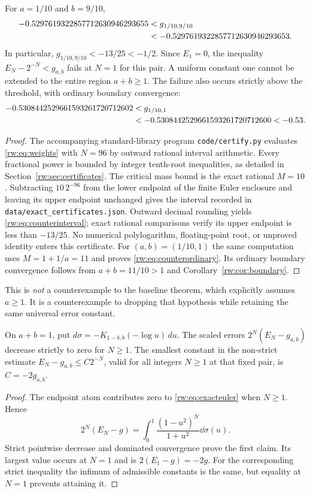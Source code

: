 \begin{theorem}\label{rw:thm:counterexample}
For $a=1/10$ and $b=9/10$,
\begin{align}\label{rw:eq:counterinterval}
 -0.5297619322857712630946293655
 &<g_{1/10,9/10}\notag\\
 &<-0.5297619322857712630946293653.
\end{align}
In particular, $g_{1/10,9/10}<-13/25<-1/2$.
Since $E_1=0$, the inequality $E_N-2^{-N}<g_{a,b}$ fails at $N=1$
for this pair. A uniform constant one cannot be extended to the
entire region $a+b\ge1$. The failure also occurs strictly above
the threshold, with ordinary boundary convergence:
\begin{align}\label{rw:eq:counterordinary}
 -0.5308442529661593261720712602
 &<g_{1/10,1}\notag\\
 &<-0.5308442529661593261720712600<-0.53.
\end{align}
\end{theorem}
\begin{proof}
The accompanying standard-library program \texttt{code/certify.py}
evaluates \eqref{rw:eq:weights} with $N=96$ by outward rational interval
arithmetic. Every fractional power is bounded by integer tenth-root
inequalities, as detailed in Section~\ref{rw:sec:certificates}. The
critical mass bound is the exact rational $M=10$. Subtracting
$10\,2^{-96}$ from the lower endpoint of the finite Euler enclosure
and leaving its upper endpoint unchanged gives the interval recorded
in \texttt{data/exact\_certificates.json}. Outward decimal rounding
yields \eqref{rw:eq:counterinterval}; exact rational comparisons verify
its upper endpoint is less than $-13/25$. No numerical polylogarithm,
floating-point root, or unproved identity enters this certificate.
For $(a,b)=(1/10,1)$ the same computation uses $M=1+1/a=11$
and proves \eqref{rw:eq:counterordinary}. Its ordinary boundary
convergence follows from $a+b=11/10>1$ and
Corollary~\ref{rw:cor:boundary}.
\end{proof}

This is \emph{not} a counterexample to the baseline theorem, which
explicitly assumes $a\ge1$. It is a counterexample to dropping that
hypothesis while retaining the same universal error constant.

\begin{proposition}
\label{rw:prop:fixedconstant}
On $a+b=1$, put $d\sigma=-K_{1-b,b}(-\log u)\,du$. The scaled errors $2^N(E_N-g_{a,b})$ decrease strictly
to zero for $N\ge1$. The smallest constant in the non-strict estimate
$E_N-g_{a,b}\le C2^{-N}$, valid for all integers $N\ge1$ at that fixed
pair, is $C=-2g_{a,b}$.
\end{proposition}
\begin{proof}
The endpoint atom contributes zero to \eqref{rw:eq:exacteuler} when
$N\ge1$. Hence
\[
 2^N(E_N-g)=\int_0^1\frac{(1-u^2)^N}{1+u^2}\dd\sigma(u).
\]
Strict pointwise decrease and dominated convergence prove the first
claim. Its largest value occurs at $N=1$ and is $2(E_1-g)=-2g$.
For the corresponding strict inequality the infimum of admissible
constants is the same, but equality at $N=1$ prevents attaining it.
\end{proof}


